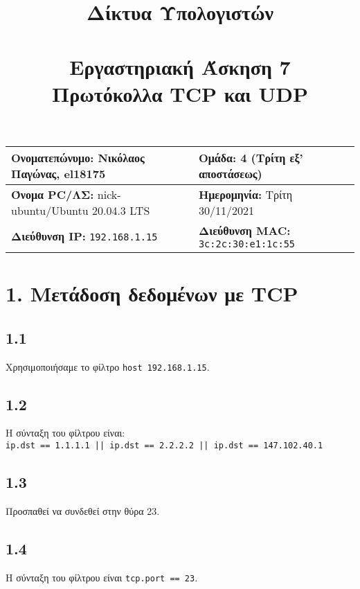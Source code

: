 

\newcommand{\imagesPath}{.}

\title{
	\textbf{Δίκτυα Υπολογιστών} \\~\\
	Εργαστηριακή Άσκηση 7 \\ 
	Πρωτόκολλα TCP και UDP
}
\author{}
\date{}


	\maketitle
	
	\begin{tabular}{|l|l|}
		\hline
		\textbf{Ονοματεπώνυμο:} Νικόλαος Παγώνας, el18175 & \textbf{Ομάδα:} 4 (Τρίτη εξ' αποστάσεως) \\
		\hline
		\textbf{Όνομα PC/ΛΣ:} nick-ubuntu/Ubuntu 20.04.3 LTS & \textbf{Ημερομηνία:} Τρίτη 30/11/2021\\
		\hline
		\textbf{Διεύθυνση IP:} \verb|192.168.1.15| & \textbf{Διεύθυνση MAC:} \verb|3c:2c:30:e1:1c:55|\\
		\hline
	\end{tabular}

	\section*{1. Μετάδοση δεδομένων με TCP}
		
		\subsection*{1.1} 
			Χρησιμοποιήσαμε το φίλτρο \verb|host 192.168.1.15|.
		
		\subsection*{1.2} 
			Η σύνταξη του φίλτρου είναι: \\
		 	\verb+ip.dst == 1.1.1.1 || ip.dst == 2.2.2.2 || ip.dst == 147.102.40.1+
		
		\subsection*{1.3} 
			Προσπαθεί να συνδεθεί στην θύρα 23.
		
		\subsection*{1.4} 
			Η σύνταξη του φίλτρου είναι \verb|tcp.port == 23|.
		
